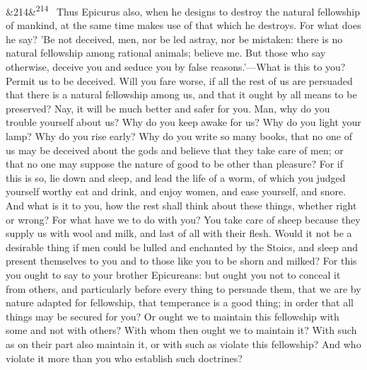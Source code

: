 \documentclass[12pt]{article}
\newcommand{\para}[1][]{\par\noindent\ifx&#1&\else\textsuperscript{\footnotesize #1}~\fi}
\begin{document}
\para[214] Thus Epicurus also, when he designs to destroy the natural fellowship of mankind, at the same time makes use of that which he destroys. For what does he say? 'Be not deceived, men, nor be led astray, nor be mistaken: there is no natural fellowship among rational animals; believe me. But those who say otherwise, deceive you and seduce you by false reasons.'—What is this to you? Permit us to be deceived. Will you fare worse, if all the rest of us are persuaded that there is a natural fellowship among us, and that it ought by all means to be preserved? Nay, it will be much better and safer for you. Man, why do you trouble yourself about us? Why do you keep awake for us? Why do you light your lamp? Why do you rise early? Why do you write so many books, that no one of us may be deceived about the gods and believe that they take care of men; or that no one may suppose the nature of good to be other than pleasure? For if this is so, lie down and sleep, and lead the life of a worm, of which you judged yourself worthy eat and drink, and enjoy women, and ease yourself, and snore. And what is it to you, how the rest shall think about these things, whether right or wrong? For what have we to do with you? You take care of sheep because they supply us with wool and milk, and last of all with their flesh. Would it not be a desirable thing if men could be lulled and enchanted by the Stoics, and sleep and present themselves to you and to those like you to be shorn and milked? For this you ought to say to your brother Epicureans: but ought you not to conceal it from others, and particularly before every thing to persuade them, that we are by nature adapted for fellowship, that temperance is a good thing; in order that all things may be secured for you? Or ought we to maintain this fellowship with some and not with others? With whom then ought we to maintain it? With such as on their part also maintain it, or with such as violate this fellowship? And who violate it more than you who establish such doctrines?
\end{document}
